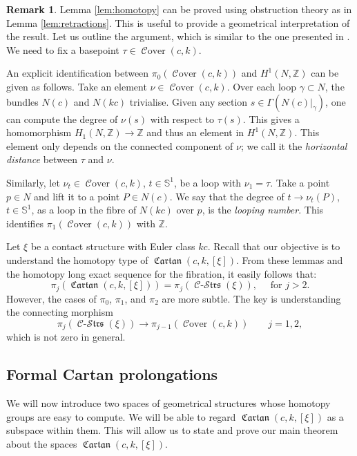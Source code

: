 \documentclass[10pt]{amsart}
\newcommand{\Cover}{\operatorname{\mathcal{C}over}}
\newcommand{\Cartan}{\operatorname{\mathfrak{Cartan}}}
\newcommand{\Cont}{\operatorname{\mathcal{C}-\mathcal{S}\mathfrak{trs}}}
\newcommand{\Z}{{\mathbb{Z}}}
\newcommand{\NS}{{\mathbb{S}}}
\theoremstyle{definition}
\newtheorem{remark}{Remark}
\begin{document}
\begin{remark} \label{rem:horizontalDistance}
Lemma \ref{lem:homotopy} can be proved using obstruction theory as in Lemma \ref{lem:retractions}. This is useful to provide a geometrical interpretation of the result. Let us outline the argument, which is similar to the one presented in \cite{KS}. We need to fix a basepoint $\tau \in \Cover(c,k)$.

An explicit identification between $\pi_0(\Cover(c,k))$ and $H^1(N, \mathbb{Z})$ can be given as follows. Take an element $\nu \in \Cover(c,k)$. Over each loop $\gamma \subset N$, the bundles $N(c)$ and $N(kc)$ trivialise. Given any section $s \in \Gamma(N(c)|_\gamma)$, one can compute the degree of $\nu(s)$ with respect to $\tau(s)$. This gives a homomorphism $H_1(N,\Z) \to \Z$ and thus an element in $H^1(N, \mathbb{Z})$. This element only depends on the connected component of $\nu$; we call it the \textsl{horizontal distance} between $\tau$ and $\nu$.

Similarly, let $\nu_t \in \Cover(c,k)$, $t \in \NS^1$, be a loop with $\nu_1 = \tau$. Take a point $p \in N$ and lift it to a point $P \in N(c)$. We say that the degree of $t \to \nu_t(P)$, $t \in \NS^1$, as a loop in the fibre of $N(kc)$ over $p$, is the \emph{looping number}. This identifies $\pi_1(\Cover(c,k))$ with $\Z$.
\end{remark}

Let $\xi$ be a contact structure with Euler class $kc$. Recall that our objective is to understand the homotopy type of $\Cartan(c,k,[\xi])$. From these lemmas and the homotopy long exact sequence for the fibration, it easily follows that:
\[ \pi_j(\Cartan(c,k,[\xi])) = \pi_j(\Cont(\xi)), \quad \text{ for } j>2. \]
However, the cases of $\pi_0$, $\pi_1$, and $\pi_2$ are more subtle. The key is understanding the connecting morphism
\[ \pi_j(\Cont(\xi)) \to \pi_{j-1}(\Cover(c,k)) \qquad j=1,2, \]
which is not zero in general.



\subsection{Formal Cartan prolongations} \label{ssec:FCartan}

We will now introduce two spaces of geometrical structures whose homotopy groups are easy to compute. We will be able to regard $\Cartan(c,k,[\xi])$ as a subspace within them. This will allow us to state and prove our main theorem about the spaces $\Cartan(c,k,[\xi])$.
\end{document}
